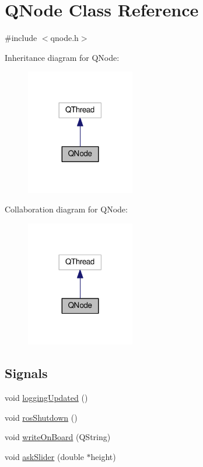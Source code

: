 \hypertarget{class_q_node}{}\section{Q\+Node Class Reference}
\label{class_q_node}


{\ttfamily \#include $<$qnode.\+h$>$}



Inheritance diagram for Q\+Node\+:
\nopagebreak
\begin{figure}[H]
\begin{center}
\leavevmode
\includegraphics[width=134pt]{class_q_node__inherit__graph}
\end{center}
\end{figure}


Collaboration diagram for Q\+Node\+:
\nopagebreak
\begin{figure}[H]
\begin{center}
\leavevmode
\includegraphics[width=134pt]{class_q_node__coll__graph}
\end{center}
\end{figure}
\subsection*{Signals}
\begin{DoxyCompactItemize}
\item 
void \hyperlink{class_q_node_abddcd4e0187f6d4513bbee7ba4656827}{logging\+Updated} ()
\item 
void \hyperlink{class_q_node_a7888b171c93c5f47334f5d2815adf445}{ros\+Shutdown} ()
\item 
void \hyperlink{class_q_node_a80d139522a1333db2c6ea33914c32378}{write\+On\+Board} (Q\+String)
\item 
void \hyperlink{class_q_node_a9a317b8b5e502c6eac639910c36dea3c}{ask\+Slider} (double $\ast$height)
\end{DoxyCompactItemize}
